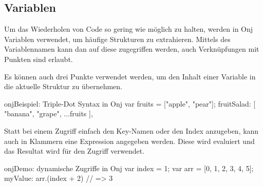 
\subsection{Variablen}\label{subsec:variablen}

\renewcommand{\kapitelautor}{Autor: Marvin Kurka}

Um das Wiederholen von Code so gering wie möglich zu halten, werden in Onj Variablen verwendet, um häufige Strukturen
zu extrahieren.
Mittels des Variablennamen kann dan auf diese zugegriffen werden, auch Verknüpfungen mit Punkten sind erlaubt.


Es können auch drei Punkte verwendet werden, um den Inhalt einer Variable in die aktuelle Struktur zu übernehmen.

\begin{codeBlock}{onj}{Beispiel: Triple-Dot Syntax in Onj}
var fruits = ["apple", "pear"];
fruitSalad: [
    "banana",
    "grape",
    ...fruits
],
\end{codeBlock}

Statt bei einem Zugriff einfach den Key-Namen oder den Index anzugeben, kann auch in Klammern eine Expression angegeben
werden.
Diese wird evaluiert und das Resultat wird für den Zugriff verwendet.

\begin{codeBlock}{onj}{Demo: dynamische Zugriffe in Onj}
var index = 1;
var arr = [0, 1, 2, 3, 4, 5];
myValue: arr.(index + 2) // => 3
\end{codeBlock}

\renewcommand{\kapitelautor}{}
